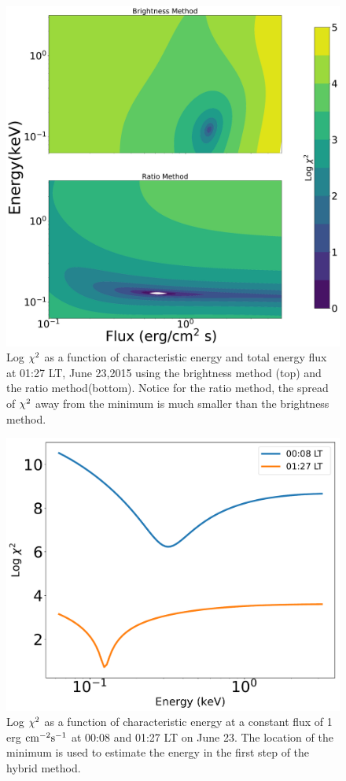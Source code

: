 \begin{figure}
	\centering\includegraphics[width=32pc]{chi_b_vs_e_127.pdf}
	\caption{Log $\rm \chi^2$ as a function of characteristic energy and total energy flux at 01:27 LT, June 23,2015 using the brightness method (top) and the ratio method(bottom). Notice for the ratio method, the spread of $\rm \chi^2$ away from the minimum is much smaller than the brightness method.}
	\label{fig:chi_127}
\end{figure}
\begin{figure}
	\centering\includegraphics[width=32pc]{different_fl_evschi2.pdf}
	\caption{Log $\rm \chi^2$ as a function of characteristic energy at a constant flux of 1 erg $\rm cm^{-2} s^{-1}$ at 00:08 and 01:27 LT on June 23. The location of the minimum is used to estimate the energy in the first step of the hybrid method.}
	\label{fig:chi_hybrid}
\end{figure}
